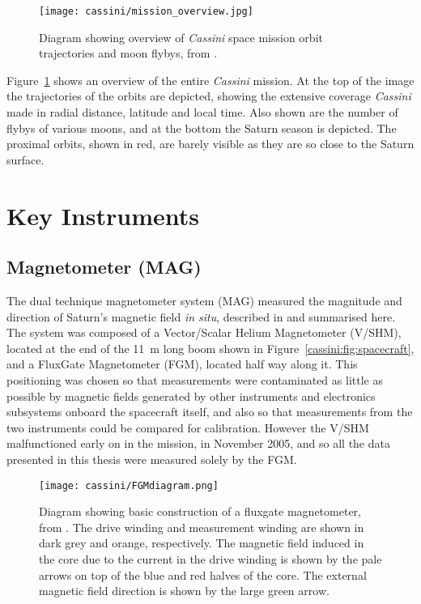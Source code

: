 \begin{figure}
\centering
\noindent\texttt{[image: cassini/mission\_overview.jpg]}
\caption[Diagram showing overview of \textit{Cassini }space mission.]{Diagram showing overview of \textit{Cassini} space mission orbit trajectories and moon flybys, from \citet{nasa2017}.}
\label{cassini:fig:missionoverview}
\end{figure}

Figure~\ref{cassini:fig:missionoverview} shows an overview of the entire \textit{Cassini} mission. At the top of the image the trajectories of the orbits are depicted, showing the extensive coverage \textit{Cassini} made in radial distance, latitude and local time. Also shown are the number of flybys of various moons, and  at the bottom the Saturn season is depicted. The proximal orbits, shown in red, are barely visible as they are so close to the Saturn surface.

\section{Key Instruments}
\subsection{Magnetometer (MAG)}
The dual technique magnetometer system (MAG) measured the magnitude and direction of Saturn's magnetic field \textit{in situ}, described in \citet{dougherty2004} and summarised here. The system was composed of a Vector/Scalar Helium Magnetometer (V/SHM), located at the end of the \SI{11}{m} long boom shown in Figure~\ref{cassini:fig:spacecraft}, and a FluxGate Magnetometer (FGM), located half way along it. This positioning was chosen so that measurements were contaminated as little as possible by magnetic fields generated by other instruments and electronics subsystems onboard the spacecraft itself, and also so that measurements from the two instruments could be compared for calibration. However the V/SHM malfunctioned early on in the mission, in November 2005, and so all the data presented in this thesis were measured solely by the FGM.

\begin{figure}
\centering
\noindent\texttt{[image: cassini/FGMdiagram.png]}
\caption[Diagram of how a fluxgate magnetometer works.]{Diagram showing basic construction of a fluxgate magnetometer, from \citet{carisma2018}. The drive winding and measurement winding are shown in dark grey and orange, respectively. The magnetic field induced in the core due to the current in  the drive winding  is shown by  the pale arrows on top of  the blue and red halves of the  core. The external magnetic field direction is shown by the large green arrow.}
\label{cassini:fig:FGMdiagram}
\end{figure}

